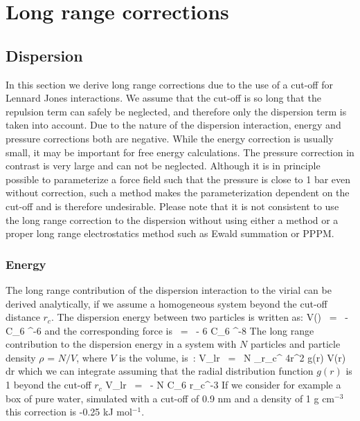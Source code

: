 \newcommand{\dr}{{\rm d}r}
\newcommand{\avcsix}{\left< C_6 \right>}
\chapter{Long range corrections}
\label{ch:lrcorr}
\section{Dispersion}
In this section we derive long range corrections due to the use of a
cut-off for Lennard Jones interactions.  We assume that the cut-off is
so long that the repulsion term can safely be neglected, and therefore
only the dispersion term is taken into account. Due to the nature of
the dispersion interaction, energy and pressure corrections both are
negative. While the energy correction is usually small, it may be
important for free energy calculations. The pressure correction in
contrast is very large and can not be neglected. Although it is in
principle possible to parameterize a force field such that the pressure
is close to 1 bar even without correction, such a method makes the
parameterization dependent on the cut-off and is therefore
undesirable. Please note that it is not consistent to use the long
range correction to the dispersion without using either a
 method or a proper long range
electrostatics method such as Ewald summation or PPPM.

\subsection{Energy}
\label{sec:ecorr}
The long range contribution of the dispersion interaction to the
virial can be derived analytically, if we assume a homogeneous
system beyond the cut-off distance $r_c$. The dispersion energy
between two particles is written as:
\beq
V(\rij)	~=~	- C_6 \rij^{-6}
\eeq
and the corresponding force is
\beq
\Fvij	~=~	- 6 C_6 \rij^{-8}\rvij
\eeq
The long range contribution to the dispersion energy
in a system with $N$ particles and particle density
$\rho$ = $N/V$, where $V$ is the volume, is~\cite{Allen87}:
\beq
V_{lr}  ~=~ \half N \rho\int_{r_c}^{\infty}   4\pi r^2 g(r) V(r) {\dr}
\eeq
which we can integrate assuming that the radial distribution function $g(r)$ 
is 1 beyond the cut-off $r_c$
\beq
V_{lr}	~=~ - N \rho\pi C_6 r_c^{-3}
\eeq
If we consider for example a box of pure water, simulated with a cut-off
of 0.9 nm and a density of 1 g cm$^{-3}$ this correction is 
-0.25 kJ mol$^{-1}$.

